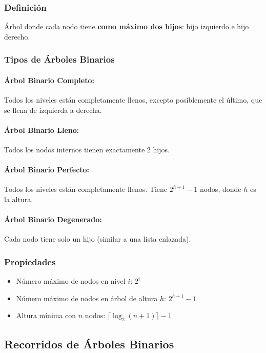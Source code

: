 \documentclass[12pt,a4paper]{article}
\begin{document}
\subsubsection{Definición}
Árbol donde cada nodo tiene \textbf{como máximo dos hijos}: hijo izquierdo e hijo derecho.

\subsubsection{Tipos de Árboles Binarios}

\paragraph{Árbol Binario Completo:}
Todos los niveles están completamente llenos, excepto posiblemente el último, que se llena de izquierda a derecha.

\paragraph{Árbol Binario Lleno:}
Todos los nodos internos tienen exactamente 2 hijos.

\paragraph{Árbol Binario Perfecto:}
Todos los niveles están completamente llenos. Tiene $2^{h+1} - 1$ nodos, donde $h$ es la altura.

\paragraph{Árbol Binario Degenerado:}
Cada nodo tiene solo un hijo (similar a una lista enlazada).

\subsubsection{Propiedades}
\begin{itemize}
    \item Número máximo de nodos en nivel $i$: $2^i$
    \item Número máximo de nodos en árbol de altura $h$: $2^{h+1} - 1$
    \item Altura mínima con $n$ nodos: $\lceil \log_2(n+1) \rceil - 1$
\end{itemize}

\subsection{Recorridos de Árboles Binarios}
\end{document}
